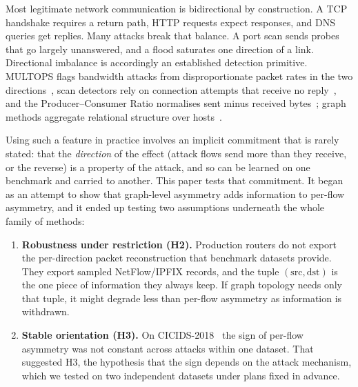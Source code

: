\documentclass[preprint,12pt]{elsarticle}
\begin{document}
Most legitimate network communication is bidirectional by construction. A TCP handshake requires a return path, HTTP requests expect responses, and DNS queries get replies. Many attacks break that balance. A port scan sends probes that go largely unanswered, and a flood saturates one direction of a link. Directional imbalance is accordingly an established detection primitive. MULTOPS flags bandwidth attacks from disproportionate packet rates in the two directions~\cite{gil2001multops}, scan detectors rely on connection attempts that receive no reply~\cite{jung2004portscan}, and the Producer--Consumer Ratio normalises sent minus received bytes~\cite{bullard2014pcr}; graph methods aggregate relational structure over hosts~\cite{akoglu2015graph,zhong2024gnnids}.

Using such a feature in practice involves an implicit commitment that is rarely stated: that the \emph{direction} of the effect (attack flows send more than they receive, or the reverse) is a property of the attack, and so can be learned on one benchmark and carried to another. This paper tests that commitment. It began as an attempt to show that graph-level asymmetry adds information to per-flow asymmetry, and it ended up testing two assumptions underneath the whole family of methods:

\begin{enumerate}
\item \textbf{Robustness under restriction (H2).} Production routers do not export the per-direction packet reconstruction that benchmark datasets provide. They export sampled NetFlow/IPFIX records, and the tuple $(\text{src}, \text{dst})$ is the one piece of information they always keep. If graph topology needs only that tuple, it might degrade less than per-flow asymmetry as information is withdrawn.
\item \textbf{Stable orientation (H3).} On CICIDS-2018~\cite{sharafaldin2018cicids} the sign of per-flow asymmetry was not constant across attacks within one dataset. That suggested H3, the hypothesis that the sign depends on the attack mechanism, which we tested on two independent datasets under plans fixed in advance.
\end{enumerate}
\end{document}

